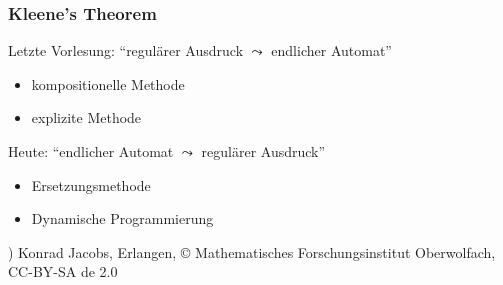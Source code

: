 \documentclass[aspectratio=1610,onlymath]{beamer}
\begin{document}
\begin{frame}\frametitle{Kleene's Theorem}

\medskip

Letzte Vorlesung: "`regulärer Ausdruck $\leadsto$ endlicher Automat"'
\begin{itemize}
\item kompositionelle Methode
\item explizite Methode
\end{itemize}
\bigskip

Heute: "`endlicher Automat $\leadsto$ regulärer Ausdruck"'
\begin{itemize}
\item Ersetzungsmethode
\item Dynamische Programmierung
\end{itemize}


\hspace{8.1cm}

{\tiny *) Konrad Jacobs, Erlangen, \copyright{} Mathematisches Forschungsinstitut Oberwolfach, CC-BY-SA de 2.0}


\end{frame}

\end{document}
